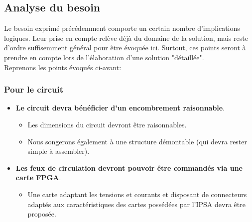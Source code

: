 \subsection{Analyse du besoin}

Le besoin exprimé précédemment comporte un certain nombre d'implications logiques.
Leur prise en compte relève déjà du domaine de la solution, mais reste d'ordre suffisemment général pour être évoquée ici. Surtout, ces points seront à prendre en compte lors de l'élaboration d'une solution "détaillée".\\

Reprenons les points évoqués ci-avant:

\renewcommand{\labelitemi}{\textbullet}
\renewcommand{\labelitemii}{$\Rightarrow$}
\renewcommand{\labelitemiii}{-}
\renewcommand{\labelitemiv}{\textbullet}

	\subsubsection{Pour le circuit}
		\begin{itemize}
			\item \textbf{Le circuit devra bénéficier d'un encombrement raisonnable}.
			\begin{itemize}
				\item Les dimensions du circuit devront être raisonnables.
				\item Nous songerons également à une structure démontable (qui devra rester simple à assembler).
			\end{itemize}
			\item \textbf{Les feux de circulation devront pouvoir être commandés via une carte FPGA}.
			\begin{itemize}
				\item Une carte adaptant les tensions et courants et disposant de connecteurs adaptés aux caractéristiques des cartes possédées par l'IPSA devra être proposée.
			\end{itemize}
		\end{itemize}
